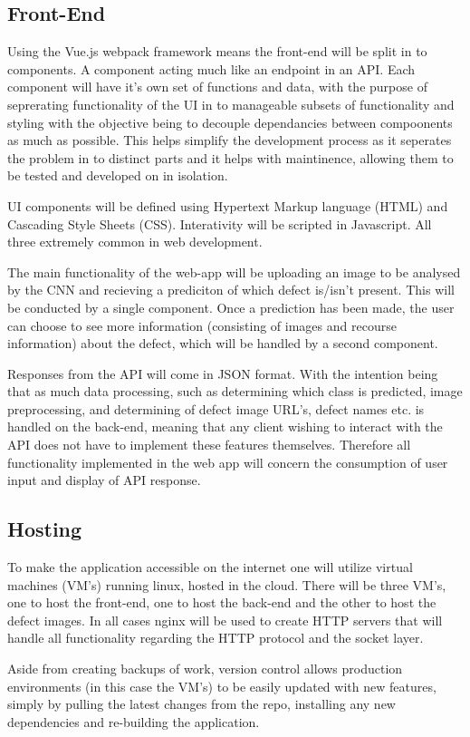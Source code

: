     \subsection{Front-End}
      Using the Vue.js webpack framework means the front-end will be split in to components. A component acting much like an endpoint in an API. Each component will have it's own set of functions and data, with the purpose of seprerating functionality of the UI in to manageable subsets of functionality and styling with the objective being to decouple dependancies between compoonents as much as possible. This helps simplify the development process as it seperates the problem in to distinct parts and it helps with maintinence, allowing them to be tested and developed on in isolation.
      \par
      UI components will be defined using Hypertext Markup language (HTML) and Cascading Style Sheets (CSS). Interativity will be scripted in Javascript. All three extremely common in web development. %
      \par
      The main functionality of the web-app will be uploading an image to be analysed by the CNN and recieving a prediciton of which defect is/isn't present. This will be conducted by a single component. Once a prediction has been made, the user can choose to see more information (consisting of images and recourse information) about the defect, which will be handled by a second component.
      \par
      Responses from the API will come in JSON format. With the intention being that as much data processing, such as determining which class is predicted, image preprocessing, and determining of defect image URL's, defect names etc. is handled on the back-end, meaning that any client wishing to interact with the API does not have to implement these features themselves. Therefore all functionality implemented in the web app will concern the consumption of user input and display of API response.

    \subsection{Hosting}
      To make the application accessible on the internet one will utilize virtual machines (VM's) running linux, hosted in the cloud. There will be three VM's, one to host the front-end, one to host the back-end and the other to host the defect images. In all cases nginx will be used to create HTTP servers that will handle all functionality regarding the HTTP protocol and the socket layer.
      \par
      Aside from creating backups of work, version control allows production environments (in this case the VM's) to be easily updated with new features, simply by pulling the latest changes from the repo, installing any new dependencies and re-building the application.



